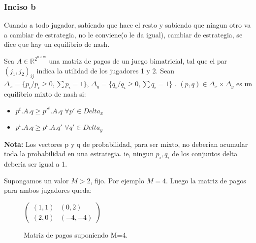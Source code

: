 \subsubsection{Inciso b}

\begin{definition}
	Cuando a todo jugador, sabiendo que hace el resto y sabiendo que ningun otro va a cambiar de estrategia, no le conviene(o le da igual), cambiar de estrategia, se dice que hay un equilibrio de nash. 
\end{definition}

\begin{definition}
	Sea $A \in \mathbb{R}^{2^{n \times m}}$ una matriz de pagos de un juego bimatricial, tal que el par $(j_1, j_2)_{ij}$ indica la utilidad de los jugadores 1 y 2. Sean $\Delta_x = \{p_i / p_i \geq 0, \displaystyle\sum p_i = 1\}$, $\Delta_y = \{q_i / q_i \geq 0, \displaystyle\sum q_i = 1\}$ . $(p, q) \in \Delta_x \times \Delta_y $ es un equilibrio mixto de nash si:
	\begin{itemize}
		\item $p^t . A . q \geq p'^{t}.A.q $  $\forall p' \in Delta_x$
		\item $p^t . A . q \geq p^{t}.A.q' $  $\forall q' \in Delta_y$
	\end{itemize}
	\textbf{Nota:} Los vectores p y q de probabilidad, para ser mixto, no deberian acumular toda la probabilidad en una estrategia. ie, ningun $p_i, q_i$ de los conjuntos delta deberia ser igual a 1. 
\end{definition}

Supongamos un valor $ M > 2$, fijo. Por ejemplo $M = 4$. Luego la matriz de pagos para ambos jugadores queda:

\vspace{0.5cm}
\begin{figure}[H]
  \centering	
$\begin{pmatrix}
	(1,1) & (0, 2) \\
	(2, 0) & (-4, -4)
\end{pmatrix} $
  \caption{Matriz de pagos suponiendo M=4.}
\end{figure}

